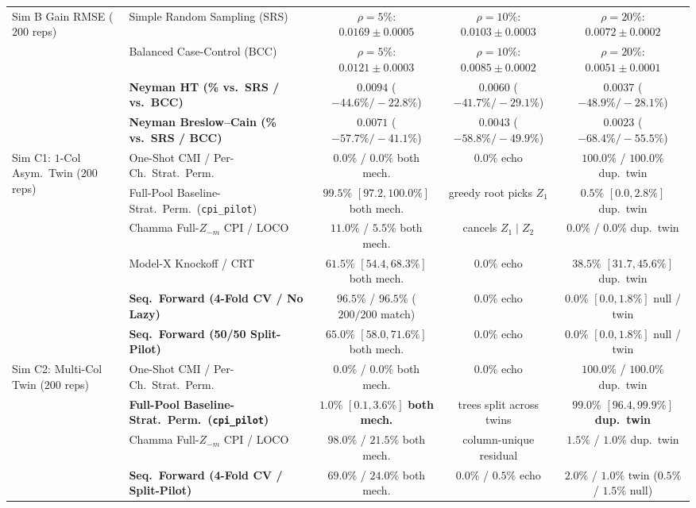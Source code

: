 \documentclass[11pt]{article}
\theoremstyle{remark}
\begin{document}
\begin{table}[t]
{\begin{tabular}{llccc}
\midrule
\multirow{4}{*}{Sim B Gain RMSE ($200$ reps)}
  & Simple Random Sampling (SRS) & $\rho=5\%$: $0.0169 \pm 0.0005$ & $\rho=10\%$: $0.0103 \pm 0.0003$ & $\rho=20\%$: $0.0072 \pm 0.0002$ \\
  & Balanced Case-Control (BCC) & $\rho=5\%$: $0.0121 \pm 0.0003$ & $\rho=10\%$: $0.0085 \pm 0.0002$ & $\rho=20\%$: $0.0051 \pm 0.0001$ \\
  & \textbf{Neyman HT (\% vs.\ SRS / vs.\ BCC)} & $\mathbf{0.0094}$ ($-44.6\% / -22.8\%$) & $\mathbf{0.0060}$ ($-41.7\% / -29.1\%$) & $\mathbf{0.0037}$ ($-48.9\% / -28.1\%$) \\
  & \textbf{Neyman Breslow--Cain (\% vs.\ SRS / BCC)} & $\mathbf{0.0071}$ ($-57.7\% / -41.1\%$) & $\mathbf{0.0043}$ ($-58.8\% / -49.9\%$) & $\mathbf{0.0023}$ ($-68.4\% / -55.5\%$) \\
\midrule
\multirow{6}{*}{Sim C1: $1$-Col Asym.\ Twin ($200$ reps)}
  & One-Shot CMI / Per-Ch.\ Strat.\ Perm. & $0.0\%$ / $0.0\%$ both mech. & $0.0\%$ echo & $100.0\%$ / $100.0\%$ dup.\ twin \\
  & Full-Pool Baseline-Strat.\ Perm.\ (\texttt{cpi\_pilot}) & $99.5\%$ $[97.2, 100.0\%]$ both mech. & greedy root picks $Z_1$ & $0.5\%$ $[0.0, 2.8\%]$ dup.\ twin \\
  & Chamma Full-$Z_{-m}$ CPI / LOCO & $11.0\%$ / $5.5\%$ both mech. & cancels $Z_1 \mid Z_2$ & $0.0\%$ / $0.0\%$ dup.\ twin \\
  & Model-X Knockoff / CRT & $61.5\%$ $[54.4, 68.3\%]$ both mech. & $0.0\%$ echo & $38.5\%$ $[31.7, 45.6\%]$ dup.\ twin \\
  & \textbf{Seq.\ Forward (4-Fold CV / No Lazy)} & $\mathbf{96.5\%}$ / $\mathbf{96.5\%}$ ($200/200$ match) & $0.0\%$ echo & $\mathbf{0.0\%}$ $[0.0, 1.8\%]$ null / twin \\
  & \textbf{Seq.\ Forward (50/50 Split-Pilot)} & $\mathbf{65.0\%}$ $[58.0, 71.6\%]$ both mech. & $0.0\%$ echo & $\mathbf{0.0\%}$ $[0.0, 1.8\%]$ null / twin \\
\midrule
\multirow{4}{*}{Sim C2: Multi-Col Twin ($200$ reps)}
  & One-Shot CMI / Per-Ch.\ Strat.\ Perm. & $0.0\%$ / $0.0\%$ both mech. & $0.0\%$ echo & $100.0\%$ / $100.0\%$ dup.\ twin \\
  & \textbf{Full-Pool Baseline-Strat.\ Perm.\ (\texttt{cpi\_pilot})} & $\mathbf{1.0\%}$ $[0.1, 3.6\%]$ \textbf{both mech.} & trees split across twins & $\mathbf{99.0\%}$ $[96.4, 99.9\%]$ \textbf{dup.\ twin} \\
  & Chamma Full-$Z_{-m}$ CPI / LOCO & $98.0\%$ / $21.5\%$ both mech. & column-unique residual & $1.5\%$ / $1.0\%$ dup.\ twin \\
  & \textbf{Seq.\ Forward (4-Fold CV / Split-Pilot)} & $\mathbf{69.0\%}$ / $\mathbf{24.0\%}$ both mech. & $0.0\%$ / $0.5\%$ echo & $\mathbf{2.0\%}$ / $\mathbf{1.0\%}$ twin ($0.5\%$ / $1.5\%$ null) \\
\bottomrule
\end{tabular}%
}
\end{table}
\end{document}
